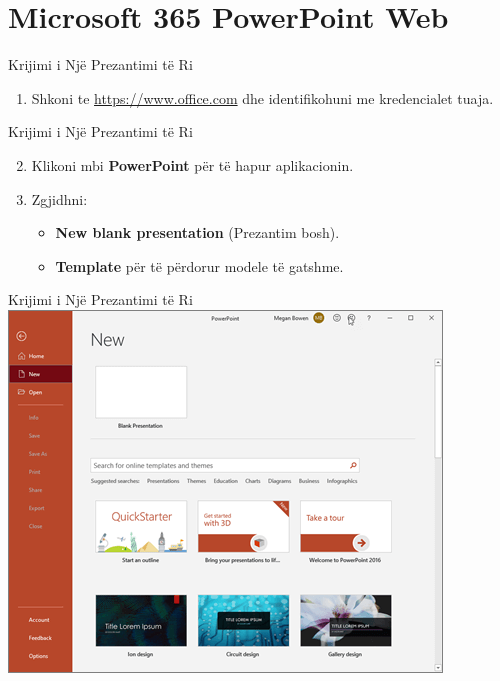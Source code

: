 \documentclass[
  ignorenonframetext,
]{beamer}
\providecommand{\tightlist}{%
  \setlength{\itemsep}{0pt}\setlength{\parskip}{0pt}}
\begin{document}
\section{Microsoft 365 PowerPoint
Web}\label{microsoft-365-powerpoint-web}

\begin{frame}{Krijimi i Një Prezantimi të Ri}
\label{krijimi-i-njuxeb-prezantimi-tuxeb-ri}
\begin{enumerate}
\tightlist
\item
  Shkoni te \url{https://www.office.com} dhe identifikohuni me
  kredencialet tuaja.
\end{enumerate}
\end{frame}

\begin{frame}{Krijimi i Një Prezantimi të Ri}
\label{krijimi-i-njuxeb-prezantimi-tuxeb-ri-1}
\begin{enumerate}
\setcounter{enumi}{1}
\item
  Klikoni mbi \textbf{PowerPoint} për të hapur aplikacionin.
\item
  Zgjidhni:

  \begin{itemize}
  \item
    \textbf{New blank presentation} (Prezantim bosh).
  \item
    \textbf{Template} për të përdorur modele të gatshme.
  \end{itemize}
\end{enumerate}
\end{frame}

\begin{frame}{Krijimi i Një Prezantimi të Ri}
\label{krijimi-i-njuxeb-prezantimi-tuxeb-ri-2}
\includegraphics{./images/powerpoint1.png}
\end{frame}
\end{document}
